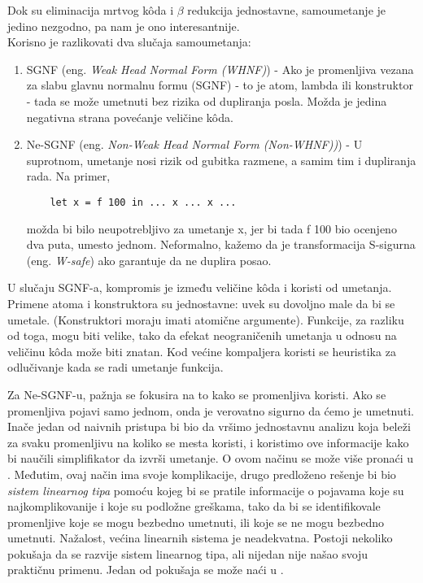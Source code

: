 Dok su eliminacija mrtvog k\^{o}da i $\beta$ redukcija jednostavne, samoumetanje je jedino nezgodno, pa nam je ono interesantnije. \\

Korisno je razlikovati dva slučaja samoumetanja:
\begin{enumerate}
	\item SGNF (eng. \emph{Weak Head Normal Form (WHNF)}) - Ako je promenljiva vezana za slabu glavnu normalnu formu (SGNF) - to 
	je atom, lambda ili konstruktor - tada se može umetnuti bez rizika od dupliranja posla. Možda je jedina negativna strana povećanje veličine k\^{o}da.
	\item Ne-SGNF (eng. \emph{Non-Weak Head Normal Form (Non-WHNF))}) - U suprotnom, umetanje nosi rizik od gubitka razmene, a samim tim i dupliranja rada. Na primer,
	\begin{verbatim}
	let x = f 100 in ... x ... x ... 
	\end{verbatim}
	možda bi bilo neupotrebljivo za umetanje x, jer bi tada f 100 bio ocenjeno dva puta, umesto jednom. Neformalno, kažemo da je transformacija S-sigurna (eng. \emph{W-safe}) ako garantuje da ne duplira posao.
\end{enumerate}

U slučaju SGNF-a, kompromis je između veličine k\^{o}da i koristi od umetanja. Primene atoma i konstruktora su jednostavne: uvek su dovoljno male da bi se umetale. (Konstruktori moraju imati atomične argumente). Funkcije, za razliku od toga, mogu biti velike, tako da efekat neograničenih umetanja u odnosu na veličinu k\^{o}da može biti znatan. Kod većine kompaljera koristi se heuristika za odlučivanje kada se radi umetanje funkcija.

Za Ne-SGNF-u, pažnja se fokusira na to kako se promenljiva koristi. Ako se promenljiva pojavi samo jednom, onda je verovatno sigurno da ćemo je umetnuti. Inače jedan od naivnih pristupa bi bio da vršimo jednostavnu analizu koja beleži za svaku promenljivu na koliko se mesta koristi, i koristimo ove informacije kako bi naučili simplifikator da izvrši umetanje. O ovom načinu se može više pronaći u \cite{appel}. Međutim, ovaj način ima svoje komplikacije, drugo predloženo rešenje bi bio \textit{sistem linearnog tipa} pomoću kojeg bi se pratile informacije o pojavama koje su najkomplikovanije i koje su podložne greškama, tako da bi se identifikovale promenljive koje se mogu bezbedno umetnuti, ili koje se ne mogu bezbedno umetnuti. Nažalost, većina linearnih sistema je neadekvatna. Postoji nekoliko pokušaja da se razvije sistem linearnog tipa, ali nijedan nije našao svoju praktičnu primenu. Jedan od pokušaja se može naći u \cite{transformation-based-optimiser-Haskell}. 

